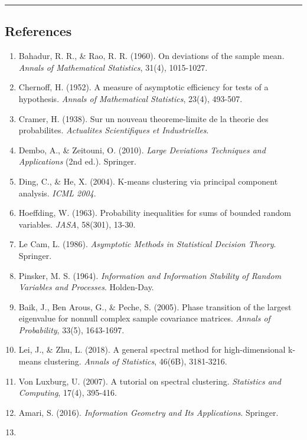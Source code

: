 \documentclass[
  12pt,
]{article}
\providecommand{\tightlist}{%
  \setlength{\itemsep}{0pt}\setlength{\parskip}{0pt}}
\begin{document}
\begin{center}\rule{0.5\linewidth}{0.5pt}\end{center}

\subsection{References}\label{references}

\begin{enumerate}
\def\labelenumi{\arabic{enumi}.}
\tightlist
\item
  Bahadur, R. R., \& Rao, R. R. (1960). On deviations of the sample
  mean. \emph{Annals of Mathematical Statistics}, 31(4), 1015-1027.
\item
  Chernoff, H. (1952). A measure of asymptotic efficiency for tests of a
  hypothesis. \emph{Annals of Mathematical Statistics}, 23(4), 493-507.
\item
  Cramer, H. (1938). Sur un nouveau theoreme-limite de la theorie des
  probabilites. \emph{Actualites Scientifiques et Industrielles}.
\item
  Dembo, A., \& Zeitouni, O. (2010). \emph{Large Deviations Techniques
  and Applications} (2nd ed.). Springer.
\item
  Ding, C., \& He, X. (2004). K-means clustering via principal component
  analysis. \emph{ICML 2004}.
\item
  Hoeffding, W. (1963). Probability inequalities for sums of bounded
  random variables. \emph{JASA}, 58(301), 13-30.
\item
  Le Cam, L. (1986). \emph{Asymptotic Methods in Statistical Decision
  Theory}. Springer.
\item
  Pinsker, M. S. (1964). \emph{Information and Information Stability of
  Random Variables and Processes}. Holden-Day.
\item
  Baik, J., Ben Arous, G., \& Peche, S. (2005). Phase transition of the
  largest eigenvalue for nonnull complex sample covariance matrices.
  \emph{Annals of Probability}, 33(5), 1643-1697.
\item
  Lei, J., \& Zhu, L. (2018). A general spectral method for
  high-dimensional k-means clustering. \emph{Annals of Statistics},
  46(6B), 3181-3216.
\item
  Von Luxburg, U. (2007). A tutorial on spectral clustering.
  \emph{Statistics and Computing}, 17(4), 395-416.
\item
  Amari, S. (2016). \emph{Information Geometry and Its Applications}.
  Springer.
\item

\end{enumerate}
\end{document}
